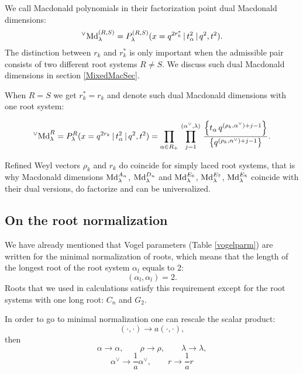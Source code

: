 \documentclass{article}
\def\MD{\hbox{Md}}%
\def\MD{\hbox{Md}}%
\def\MDv{{^\vee\hbox{Md}}}
\begin{document}
We call Macdonald polynomials in their factorization point dual Macdonald dimensions:
\begin{equation}
     \MDv_{\lambda}^{(R,S)} = P^{(R,S)}_{\lambda}(x = q^{2r_k^*}\,|\, t_{\alpha}^2\,|\, q^2, t^2).
\end{equation}
The distinction between $r_k$ and $r_k^*$ is only important when the admissible pair consists of two different root systems $R\neq S $. We discuss such dual Macdonald dimensions in section \ref{MixedMacSec}.

When $R = S$ we get $r_k^* = r_k$ and denote such dual Macdonald dimensions with one root system:

\begin{equation}
    \MDv_{\lambda}^{R} = P^{R}_{\lambda}(x = q^{2r_k}\,|\, t_{\alpha}^2\,|\, q^2, t^2) = \prod_{\alpha \in R_+} \, \prod_{j=1}^{(\alpha^{\vee},\lambda)}\,  \frac{\left\{t_{\alpha}\, q^{(\rho_k,\alpha^{\vee})+j-1}\right\}}{\left\{ q^{(\rho_k,\alpha^{\vee})+j-1}\right\}}.
\end{equation}

Refined Weyl vectors $\rho_k$ and $r_k$ do coincide for simply laced root systems, that is why Macdonald dimensions $\MD_{\lambda}^{A_n}$, $\MD_{\lambda}^{D_n}$ and $\MD_{\lambda}^{E_6}$, $\MD_{\lambda}^{E_7}$, $\MD_{\lambda}^{E_8}$ coincide with their dual versions, do factorize and can be universalized.

\subsection{On the root normalization}
We have already mentioned that Vogel parameters (Table \ref{vogelparm}) are written for the minimal normalization of roots, which means that the length of the longest root of the root system $\alpha_l$ equals to 2:
\begin{equation}
    (\alpha_l,\alpha_l) = 2.
\end{equation}
Roots that we used in calculations satisfy this requirement except for the root systems with one long root: $C_n$ and $G_2$.

In order to go to minimal normalization one can rescale the scalar product:
\begin{equation}
     (\cdot,\cdot) \rightarrow a(\cdot,\cdot),
\end{equation}
then
\begin{equation}
    \alpha \rightarrow \alpha, \quad \quad \rho \rightarrow \rho,  \quad\quad \lambda \rightarrow \lambda,
\end{equation}
\begin{equation}
    \alpha^{\vee} \rightarrow \frac{1}{a} \alpha^{\vee}, \quad\quad r \rightarrow \frac{1}{a} r
\end{equation}
\end{document}
